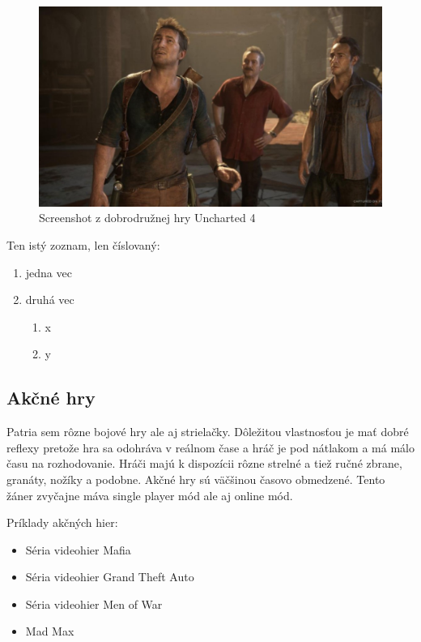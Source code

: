 \documentclass[10pt,twoside,slovak,a4paper]{coursepaper}
\begin{document}
\begin{figure}[tbh]
\centering
\includegraphics[scale=0.3]{Screenshot.jpg}
\caption{Screenshot z dobrodružnej hry Uncharted 4}
\label{f:uncharted}
\end{figure}

Ten istý zoznam, len číslovaný:

\begin{enumerate}
\item jedna vec
\item druhá vec
	\begin{enumerate}
	\item x
	\item y
	\end{enumerate}
\end{enumerate}


\subsection{Akčné hry} \label{zanre:akcne}

Patria sem rôzne bojové hry ale aj strielačky. Dôležitou vlastnosťou je mať dobré reflexy pretože hra sa odohráva v reálnom čase a hráč je pod nátlakom a má málo času na rozhodovanie. Hráči majú k dispozícii rôzne strelné a tiež ručné zbrane, granáty, nožíky a podobne. Akčné hry sú väčšinou časovo obmedzené. Tento žáner zvyčajne máva single player mód ale aj online mód.

Príklady akčných hier:
\begin{itemize}
\item Séria videohier Mafia
\item Séria videohier Grand Theft Auto
\item Séria videohier Men of War
\item Mad Max
\end{itemize}
\end{document}
